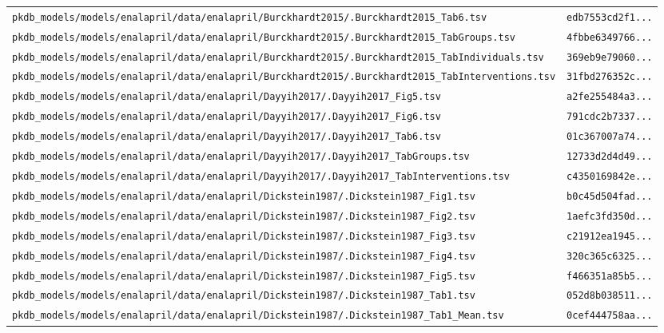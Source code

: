 \documentclass{article}
\begin{document}
\begin{longtable}{ll}
\texttt{pkdb\_models/models/enalapril/data/enalapril/Burckhardt2015/.Burckhardt2015\_Tab6.tsv} & \texttt{edb7553cd2f1...} \\
\texttt{pkdb\_models/models/enalapril/data/enalapril/Burckhardt2015/.Burckhardt2015\_TabGroups.tsv} & \texttt{4fbbe6349766...} \\
\texttt{pkdb\_models/models/enalapril/data/enalapril/Burckhardt2015/.Burckhardt2015\_TabIndividuals.tsv} & \texttt{369eb9e79060...} \\
\texttt{pkdb\_models/models/enalapril/data/enalapril/Burckhardt2015/.Burckhardt2015\_TabInterventions.tsv} & \texttt{31fbd276352c...} \\
\texttt{pkdb\_models/models/enalapril/data/enalapril/Dayyih2017/.Dayyih2017\_Fig5.tsv} & \texttt{a2fe255484a3...} \\
\texttt{pkdb\_models/models/enalapril/data/enalapril/Dayyih2017/.Dayyih2017\_Fig6.tsv} & \texttt{791cdc2b7337...} \\
\texttt{pkdb\_models/models/enalapril/data/enalapril/Dayyih2017/.Dayyih2017\_Tab6.tsv} & \texttt{01c367007a74...} \\
\texttt{pkdb\_models/models/enalapril/data/enalapril/Dayyih2017/.Dayyih2017\_TabGroups.tsv} & \texttt{12733d2d4d49...} \\
\texttt{pkdb\_models/models/enalapril/data/enalapril/Dayyih2017/.Dayyih2017\_TabInterventions.tsv} & \texttt{c4350169842e...} \\
\texttt{pkdb\_models/models/enalapril/data/enalapril/Dickstein1987/.Dickstein1987\_Fig1.tsv} & \texttt{b0c45d504fad...} \\
\texttt{pkdb\_models/models/enalapril/data/enalapril/Dickstein1987/.Dickstein1987\_Fig2.tsv} & \texttt{1aefc3fd350d...} \\
\texttt{pkdb\_models/models/enalapril/data/enalapril/Dickstein1987/.Dickstein1987\_Fig3.tsv} & \texttt{c21912ea1945...} \\
\texttt{pkdb\_models/models/enalapril/data/enalapril/Dickstein1987/.Dickstein1987\_Fig4.tsv} & \texttt{320c365c6325...} \\
\texttt{pkdb\_models/models/enalapril/data/enalapril/Dickstein1987/.Dickstein1987\_Fig5.tsv} & \texttt{f466351a85b5...} \\
\texttt{pkdb\_models/models/enalapril/data/enalapril/Dickstein1987/.Dickstein1987\_Tab1.tsv} & \texttt{052d8b038511...} \\
\texttt{pkdb\_models/models/enalapril/data/enalapril/Dickstein1987/.Dickstein1987\_Tab1\_Mean.tsv} & \texttt{0cef444758aa...} \\

\end{longtable}
\end{document}
